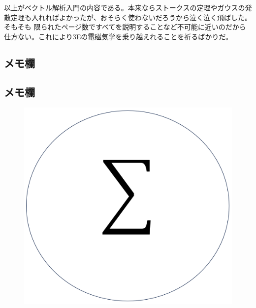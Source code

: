 \documentclass[a4j,dvipdfmx]{jsarticle}
\begin{document}
            以上がベクトル解析入門の内容である。本来ならストークスの定理やガウスの発散定理も入れればよかったが、おそらく使わないだろうから泣く泣く飛ばした。そもそも
            限られたページ数ですべてを説明することなど不可能に近いのだから仕方ない。これにより3Eの電磁気学を乗り越えれることを祈るばかりだ。
        
        \clearpage
            \subsection*{メモ欄}
        \clearpage
            \subsection*{メモ欄}
        \clearpage

        \thispagestyle{fancy}
        \fancyhead{}

        \begin{figure}
            \centering
            \includegraphics[scale=0.5]{img/QuuNote/icon.png}
        \end{figure}    

        
\end{document}
